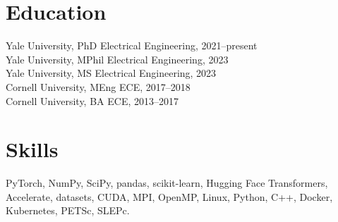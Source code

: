 \documentclass[10pt]{article}
\begin{document}
\section{Education}
Yale University, PhD Electrical Engineering, 2021--present\\
Yale University, MPhil Electrical Engineering, 2023\\
Yale University, MS Electrical Engineering, 2023\\
Cornell University, MEng ECE, 2017--2018\\
Cornell University, BA ECE, 2013--2017
\section{Skills}
PyTorch, NumPy, SciPy, pandas, scikit-learn, Hugging Face Transformers,
Accelerate, datasets, CUDA, MPI, OpenMP, Linux, Python, C++, Docker,
Kubernetes, PETSc, SLEPc.
\end{document}
